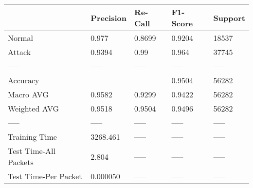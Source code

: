 \begin{tabular}{lllll}
\toprule
{} & Precision & Re-Call & F1-Score & Support \\
\midrule
Normal                &     0.977 &  0.8699 &   0.9204 &   18537 \\
Attack                &    0.9394 &    0.99 &    0.964 &   37745 \\
-----                 &     ----- &   ----- &    ----- &   ----- \\
Accuracy              &           &         &   0.9504 &   56282 \\
Macro AVG             &    0.9582 &  0.9299 &   0.9422 &   56282 \\
Weighted AVG          &    0.9518 &  0.9504 &   0.9496 &   56282 \\
-----                 &     ----- &   ----- &    ----- &   ----- \\
Training Time         &  3268.461 &   ----- &    ----- &   ----- \\
Test Time-All Packets &     2.804 &   ----- &    ----- &   ----- \\
Test Time-Per Packet  &  0.000050 &   ----- &    ----- &   ----- \\
\bottomrule
\end{tabular}
